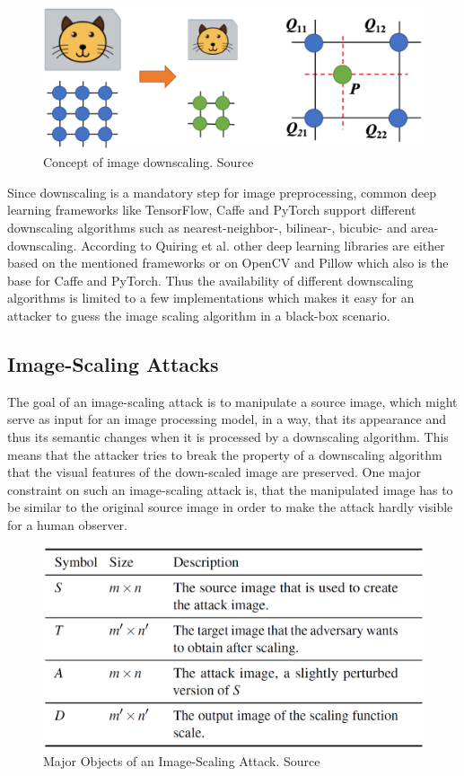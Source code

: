 \documentclass[sigconf]{acmart}
\begin{document}
\begin{figure}[h]
  \centering
  \includegraphics[width=\linewidth]{img/img_scaling.png}
  \caption{Concept of image downscaling. Source \cite{camouflage}}
  \Description{}
  \label{fig:scaling}
\end{figure}

Since downscaling is a mandatory step for image preprocessing, common deep learning frameworks like TensorFlow, Caffe and PyTorch support different downscaling algorithms such as nearest-neighbor-, bilinear-, bicubic- and area-downscaling.
According to Quiring et al.\cite{imgscale} other deep learning libraries are either based on the mentioned frameworks or on OpenCV and Pillow which also is the base for Caffe and PyTorch.
Thus the availability of different downscaling algorithms is limited to a few implementations which makes it easy for an attacker to guess the image scaling algorithm in a black-box scenario.

\subsection{Image-Scaling Attacks}
\label{sec:imgscaleattack}
The goal of an image-scaling attack is to manipulate a source image, which might serve as input for an image processing model, in a way, that its appearance and thus its semantic changes when it is processed by a downscaling algorithm.
This means that the attacker tries to break the property of a downscaling algorithm that the visual features of the down-scaled image are preserved.
One major constraint on such an image-scaling attack is, that the manipulated image has to be similar to the original source image in order to make the attack hardly visible for a human observer.

\begin{figure}[h]
  \centering
  \includegraphics[width=\linewidth]{img/table_attack_symbols.png}
  \caption{Major Objects of an Image-Scaling Attack. Source \cite{imgscale}}
  \Description{}
  \label{fig:table}
\end{figure}
\end{document}
